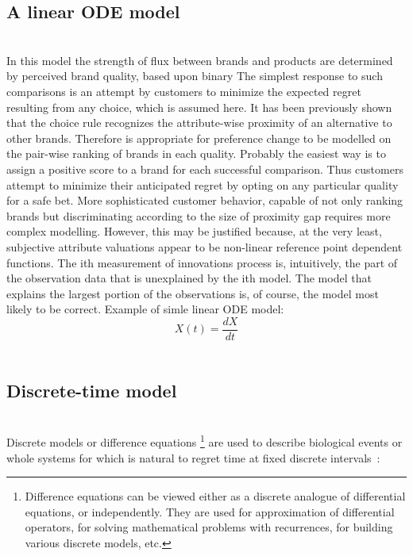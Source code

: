 \subsection{A linear ODE model} \label{subsec:ode}\\
In this model the strength of flux between brands and products are determined by perceived brand quality, based upon binary
The simplest response to such comparisons is an attempt by customers to minimize the expected regret resulting from any choice, which is assumed here.
It has been previously shown that the choice rule recognizes the attribute-wise proximity of an alternative to other brands.
Therefore is appropriate for preference change to be modelled on the pair-wise ranking of brands in each quality.
Probably the easiest way is to assign a positive score to a brand for each successful comparison.
Thus customers attempt to minimize their anticipated regret by opting on any particular quality for a safe bet.
More sophisticated customer behavior, capable of not only ranking brands but discriminating according to the size of proximity gap requires more complex modelling.
However, this may be justified because, at the very least, subjective attribute valuations appear to be non-linear reference point dependent functions.
The ith measurement of innovations process is, intuitively, the part of the observation data that is unexplained by the ith model.
The model that explains the largest portion of the observations is, of course, the model most likely to be correct.
Example of simle linear ODE model:\\
$$X(t) = \frac{dX}{dt}$$
\\
\subsection{Discrete-time model} \label{subsec:discrete}\\
Discrete models or difference equations \footnote{Difference equations can be viewed either as a discrete analogue of differential equations, or independently.
They are used for approximation of differential operators, for solving mathematical problems with recurrences, for building various discrete
models, etc.} are used to describe biological events or whole systems for which is natural to regret time at fixed discrete intervals~\cite{pantland}:

